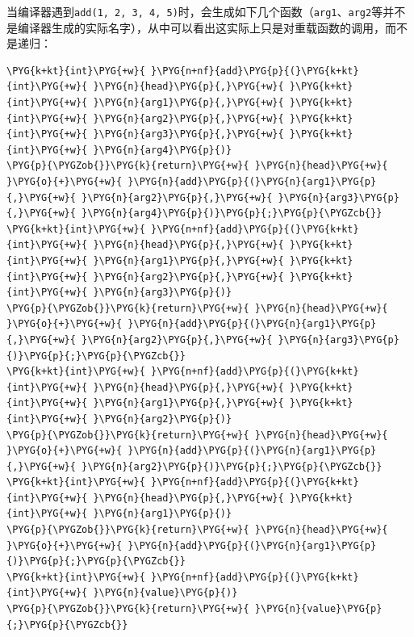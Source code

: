 
当编译器遇到\texttt{add(\allowbreak{}1, 2, 3, 4, 5)}时，会生成如下几个函数（\texttt{arg1}、\texttt{arg2}等并不是编译器生成的实际名字），从中可以看出这实际上只是对重载函数的调用，而不是递归：



\begin{codeblockbg}
\begin{Verbatim}[commandchars=\\\{\},breaklines=true,breakanywhere=true,fontsize=\codefont,xleftmargin=17bp]
\PYG{k+kt}{int}\PYG{+w}{ }\PYG{n+nf}{add}\PYG{p}{(}\PYG{k+kt}{int}\PYG{+w}{ }\PYG{n}{head}\PYG{p}{,}\PYG{+w}{ }\PYG{k+kt}{int}\PYG{+w}{ }\PYG{n}{arg1}\PYG{p}{,}\PYG{+w}{ }\PYG{k+kt}{int}\PYG{+w}{ }\PYG{n}{arg2}\PYG{p}{,}\PYG{+w}{ }\PYG{k+kt}{int}\PYG{+w}{ }\PYG{n}{arg3}\PYG{p}{,}\PYG{+w}{ }\PYG{k+kt}{int}\PYG{+w}{ }\PYG{n}{arg4}\PYG{p}{)}
\PYG{p}{\PYGZob{}}\PYG{k}{return}\PYG{+w}{ }\PYG{n}{head}\PYG{+w}{ }\PYG{o}{+}\PYG{+w}{ }\PYG{n}{add}\PYG{p}{(}\PYG{n}{arg1}\PYG{p}{,}\PYG{+w}{ }\PYG{n}{arg2}\PYG{p}{,}\PYG{+w}{ }\PYG{n}{arg3}\PYG{p}{,}\PYG{+w}{ }\PYG{n}{arg4}\PYG{p}{)}\PYG{p}{;}\PYG{p}{\PYGZcb{}}
\PYG{k+kt}{int}\PYG{+w}{ }\PYG{n+nf}{add}\PYG{p}{(}\PYG{k+kt}{int}\PYG{+w}{ }\PYG{n}{head}\PYG{p}{,}\PYG{+w}{ }\PYG{k+kt}{int}\PYG{+w}{ }\PYG{n}{arg1}\PYG{p}{,}\PYG{+w}{ }\PYG{k+kt}{int}\PYG{+w}{ }\PYG{n}{arg2}\PYG{p}{,}\PYG{+w}{ }\PYG{k+kt}{int}\PYG{+w}{ }\PYG{n}{arg3}\PYG{p}{)}
\PYG{p}{\PYGZob{}}\PYG{k}{return}\PYG{+w}{ }\PYG{n}{head}\PYG{+w}{ }\PYG{o}{+}\PYG{+w}{ }\PYG{n}{add}\PYG{p}{(}\PYG{n}{arg1}\PYG{p}{,}\PYG{+w}{ }\PYG{n}{arg2}\PYG{p}{,}\PYG{+w}{ }\PYG{n}{arg3}\PYG{p}{)}\PYG{p}{;}\PYG{p}{\PYGZcb{}}
\PYG{k+kt}{int}\PYG{+w}{ }\PYG{n+nf}{add}\PYG{p}{(}\PYG{k+kt}{int}\PYG{+w}{ }\PYG{n}{head}\PYG{p}{,}\PYG{+w}{ }\PYG{k+kt}{int}\PYG{+w}{ }\PYG{n}{arg1}\PYG{p}{,}\PYG{+w}{ }\PYG{k+kt}{int}\PYG{+w}{ }\PYG{n}{arg2}\PYG{p}{)}
\PYG{p}{\PYGZob{}}\PYG{k}{return}\PYG{+w}{ }\PYG{n}{head}\PYG{+w}{ }\PYG{o}{+}\PYG{+w}{ }\PYG{n}{add}\PYG{p}{(}\PYG{n}{arg1}\PYG{p}{,}\PYG{+w}{ }\PYG{n}{arg2}\PYG{p}{)}\PYG{p}{;}\PYG{p}{\PYGZcb{}}
\PYG{k+kt}{int}\PYG{+w}{ }\PYG{n+nf}{add}\PYG{p}{(}\PYG{k+kt}{int}\PYG{+w}{ }\PYG{n}{head}\PYG{p}{,}\PYG{+w}{ }\PYG{k+kt}{int}\PYG{+w}{ }\PYG{n}{arg1}\PYG{p}{)}
\PYG{p}{\PYGZob{}}\PYG{k}{return}\PYG{+w}{ }\PYG{n}{head}\PYG{+w}{ }\PYG{o}{+}\PYG{+w}{ }\PYG{n}{add}\PYG{p}{(}\PYG{n}{arg1}\PYG{p}{)}\PYG{p}{;}\PYG{p}{\PYGZcb{}}
\PYG{k+kt}{int}\PYG{+w}{ }\PYG{n+nf}{add}\PYG{p}{(}\PYG{k+kt}{int}\PYG{+w}{ }\PYG{n}{value}\PYG{p}{)}
\PYG{p}{\PYGZob{}}\PYG{k}{return}\PYG{+w}{ }\PYG{n}{value}\PYG{p}{;}\PYG{p}{\PYGZcb{}}
\end{Verbatim}
\end{codeblockbg}


